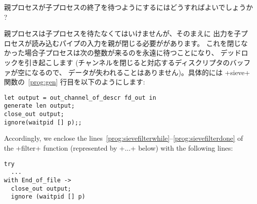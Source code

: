 \begin{exercise}
親プロセスが子プロセスの終了を待つようにするにはどうすればよいでしょうか ?
\end{exercise}
\begin{answer}
親プロセスは子プロセスを待たなくてはいけませんが、そのまえに
出力を子プロセスが読み込むパイプの入力を親が閉じる必要ががあります。
これを閉じなかった場合子プロセスは次の整数が来るのを永遠に待つことになり、
デッドロックを引き起こします (チャンネルを閉じると対応するディスクリプタのバッファが空になるので、
データが失われることはありません)。具体的には \ml+sieve+ 関数の~\ref{prog:gen} 行目を以下のようにします:
\begin{lstlisting}
let output = out_channel_of_descr fd_out in
generate len output;
close_out output;
ignore(waitpid [] p);;
\end{lstlisting}
Accordingly, we enclose the
lines~\ref{prog:sievefilterwhile}--\ref{prog:sievefilterdone} of the
\ml+filter+ function (represented by \ml+...+ below) with the
following lines:
\begin{lstlisting}
try
  ...
with End_of_file ->
  close_out output;
  ignore (waitpid [] p)
\end{lstlisting}
\end{answer}

